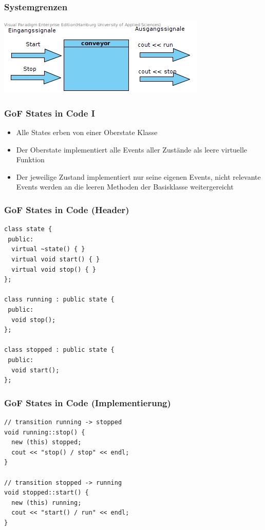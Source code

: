 \documentclass{beamer}
\begin{document}
\begin{frame}
 \frametitle{Systemgrenzen}
 \includegraphics[scale=.7]{img/Systemgrenzen_fsm_gof.jpg}
\end{frame}

\begin{frame}
 \frametitle{GoF States in Code I}
 \begin{itemize}
  \item Alle States erben von einer Oberstate Klasse
  \item Der Oberstate implementiert alle Events aller Zust\"ande als leere virtuelle Funktion
  \item Der jeweilige Zustand implementiert nur seine eigenen Events, nicht relevante
  Events werden an die leeren Methoden der Basisklasse weitergereicht
 \end{itemize}
\end{frame}

\begin{frame}[fragile]
 \frametitle{GoF States in Code (Header)}
 \begin{lstlisting}
class state {
 public:
  virtual ~state() { }
  virtual void start() { }
  virtual void stop() { }
};

class running : public state {
 public:
  void stop();
};

class stopped : public state {
 public:
  void start();
};
 \end{lstlisting}
\end{frame}

\begin{frame}[fragile]
 \frametitle{GoF States in Code (Implementierung)}
 \begin{lstlisting}
// transition running -> stopped
void running::stop() {
  new (this) stopped;
  cout << "stop() / stop" << endl;
}

// transition stopped -> running
void stopped::start() {
  new (this) running;
  cout << "start() / run" << endl;
}
 \end{lstlisting}
\end{frame}
\end{document}

